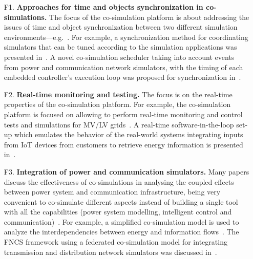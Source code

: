 \documentclass[1p]{elsarticle} %
\begin{document}
\begin{enumerate}
    \item [{F}1.] \textbf{Approaches for time and objects synchronization in co-simulations.} The focus of the co-simulation platform is about addressing the issues of time and object synchronization between two different simulation environments---e.g.~. For example, a synchronization method for coordinating simulators that can be tuned according to the simulation applications was presented in~. A novel co-simulation scheduler taking into account events from power and communication network simulators, with the timing of each embedded controller’s execution loop was proposed for synchronization in~.
  
    \item[{F}2.] \textbf{Real-time monitoring and testing.} The focus is on the real-time properties of the co-simulation platform. For example, the co-simulation platform is focused on  allowing to perform real-time monitoring and control tests and simulations for MV/LV grids~. A real-time software-in-the-loop set-up which emulates the behavior of the real-world systems integrating inputs from IoT devices from customers to retrieve energy information is presented in~.
    
    \item[{F}3.] \textbf{Integration of power and communication simulators.} Many papers discuss the effectiveness of co-simulations in analysing the coupled effects between power system and communication infrastructure, being very convenient to co-simulate different aspects instead of building a single tool with all the capabilities (power system modelling, intelligent control and communication)~. For example, a simplified co-simulation model is used to analyze the interdependencies between energy and information flows~. The FNCS framework using a federated co-simulation model for integrating transmission and distribution network simulators was discussed in~.
    

\end{enumerate}
\end{document}
